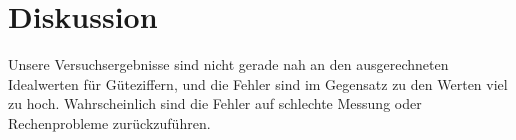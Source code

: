 \section{Diskussion}
\label{sec:Diskussion}
Unsere Versuchsergebnisse sind nicht gerade nah an den ausgerechneten Idealwerten für Güteziffern, und die Fehler sind im Gegensatz zu den Werten viel zu hoch.
Wahrscheinlich sind die Fehler auf schlechte Messung oder Rechenprobleme zurückzuführen.
